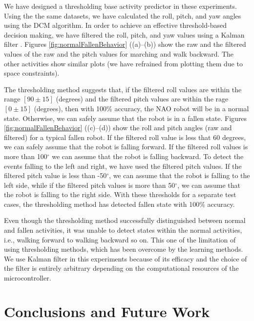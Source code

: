 \documentclass[letterpaper]{article}
\begin{document}
\begin{sloppy}
We have designed a thresholding base activity predictor in these experiments. Using the the same 
datasets, we have calculated the roll, pitch, and yaw angles  using the DCM algorithm. In order to 
achieve an effective threshold-based decision making, we have filtered the roll, pitch, and
yaw values using a Kalman filter \cite{Welch:1995:IKF:897831}. Figures 
\ref{fig:normalFallenBehavior} ((a)--(b)) show the raw and the filtered values of the raw and the 
pitch values for marching and walk backward. The other activities show similar plots (we have 
refrained from plotting them due to space constraints). 

The thresholding method suggests that, if the filtered roll values are within the range $[90\pm15]$ 
(degrees) and the filtered pitch values are within the rage $[0\pm15]$ (degrees), then with 100\% 
accuracy, the NAO  robot will be in a normal state. Otherwise, we can safely assume that the robot 
is in a fallen state. Figures \ref{fig:normalFallenBehavior} ((c)--(d)) show the roll and pitch 
angles (raw and filtered) for a typical fallen robot. If the filtered roll value is less that 60 
degrees, we can safely assume that the robot is falling forward. If the filtered roll values is 
more than 100$^{\circ}$ we can assume that the robot is falling backward. To detect the events 
falling to the left and right, we have used the filtered pitch values. If the filtered pitch value 
is less than -50$^{\circ}$, we can assume that the robot is falling to the left side, while if the 
filtered pitch values is more than 50$^{\circ}$, we can assume that the robot is falling to the right 
side. With these thresholds for a separate test cases, the thresholding method has detected fallen 
state with 100\% accuracy. 

Even though the thresholding method successfully distinguished between normal and fallen 
activities, it was unable to detect states within the normal activities, i.e., walking forward 
to walking backward so on. This one of the limitation of using thresholding methods, which has 
been overcome by the learning methods.  We use Kalman filter in this experiments because of its 
efficacy and the choice of the filter is entirely arbitrary depending on the computational 
resources of the microcontroller.  


\section{Conclusions and Future Work}


\end{sloppy}
\end{document}
